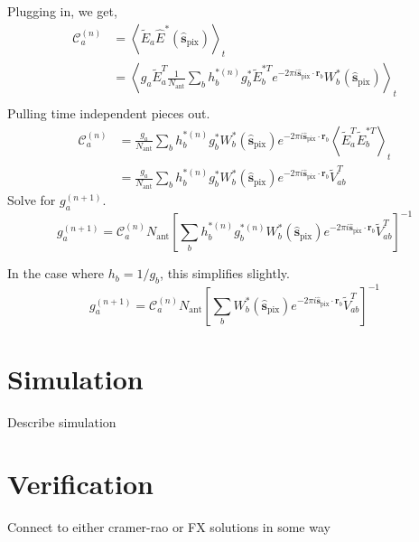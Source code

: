\documentclass[a4paper,fleqn,usenatbib]{../mnras}
\newcommand{\spix}{\hat{\mathbf{s}}_{\mathrm{pix}}}
\newcommand{\Cna}{\mathcal{C}^{(n)}_a}
\newcommand{\rb}{\mathbf{r}_b}
\newcommand{\Nant}{N_{\mathrm{ant}}}
\newcommand{\beamtheta}{W}
\newcommand{\Er}[1]{\widetilde{E}_{#1}}
\newcommand{\V}{\widetilde{V}}
\begin{document}
Plugging in, we get,
\begin{align}
\Cna & = \left<\Er{a} \hat{E}^*(\spix)\right>_t \\ 
& = \left<g_a \Er{a}^T \frac{1}{\Nant} \sum_b h^{*(n)}_b g^*_b\Er{b}^{*T} e^{-2\pi i \spix \cdot \rb} \beamtheta^*_b(\spix)\right>_t \\
\end{align}
Pulling time independent pieces out.
\begin{align}
\Cna & = \frac{g_a}{\Nant} \sum_b h^{*(n)}_b g^*_b \beamtheta^*_b(\spix) e^{-2\pi i \spix \cdot \rb} \left<\Er{a}^T \Er{b}^{*T} \right>_t \\
& = \frac{g_a}{\Nant} \sum_b h^{*(n)}_b g^*_b \beamtheta^*_b(\spix) e^{-2\pi i \spix \cdot \rb} \V^T_{ab}
\end{align}
Solve for $g^{(n+1)}_a$.
\begin{equation}
g^{(n+1)}_a = \Cna \Nant \left[ \sum_b h^{*(n)}_b g^{*(n)}_b \beamtheta^*_b(\spix) e^{-2\pi i \spix \cdot \rb} \V^T_{ab} \right]^{-1}
\end{equation}

In the case where $h_b = 1/g_b$, this simplifies slightly.
\begin{equation}
g^{(n+1)}_a = \Cna \Nant \left[ \sum_b \beamtheta^*_b(\spix) e^{-2\pi i \spix \cdot \rb} \V^T_{ab} \right]^{-1}
\end{equation}


\section{Simulation}

Describe simulation

\section{Verification}

Connect to either cramer-rao or FX solutions in some way




\end{document}

